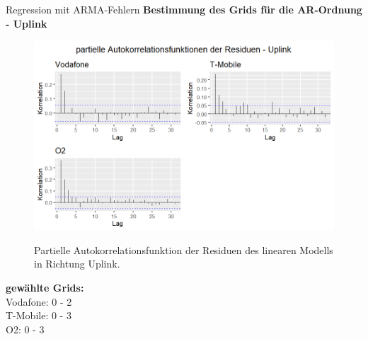 \begin{frame}{Regression mit ARMA-Fehlern}
	\textbf{Bestimmung des Grids für die AR-Ordnung - Uplink}
	\noindent\begin{minipage}{0.6\textwidth}%
		\begin{figure}
			\includegraphics[scale=0.35]{plots/arima/uplink/res_pacf}\\
			\caption{Partielle Autokorrelationsfunktion der Residuen des linearen Modells in Richtung Uplink.}
			\label{res_pacf_ul}
		\end{figure}
	\end{minipage}%
	\hfill%
	\begin{minipage}{0.4\textwidth}\raggedleft
		\vspace{1.3cm}
		\textbf{gewählte Grids:}\\
		Vodafone: 0 - 2 \\
		T-Mobile: 0 - 3 \\
		O2: 0 - 3 \\
	\end{minipage}
\end{frame}

